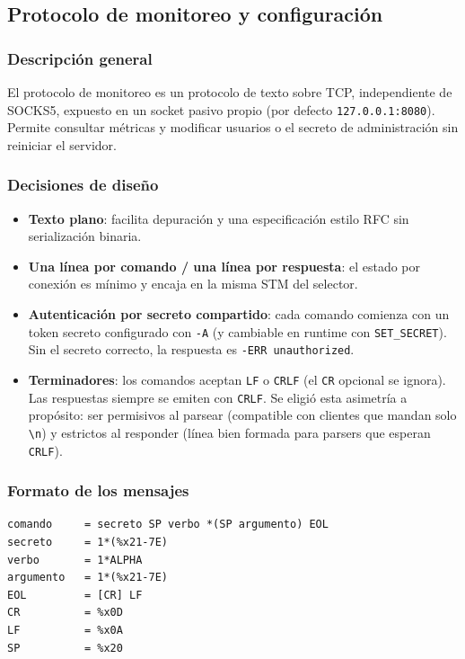 \documentclass[12pt,a4paper]{article}
\begin{document}
\subsection{Protocolo de monitoreo y configuración}

\subsubsection{Descripción general}

El protocolo de monitoreo es un protocolo de texto sobre TCP, independiente de SOCKS5,
expuesto en un socket pasivo propio (por defecto \texttt{127.0.0.1:8080}). Permite
consultar métricas y modificar usuarios o el secreto de administración sin reiniciar
el servidor.

\subsubsection{Decisiones de diseño}

\begin{itemize}
    \item \textbf{Texto plano}: facilita depuración y una especificación estilo RFC
          sin serialización binaria.
    \item \textbf{Una línea por comando / una línea por respuesta}: el estado por
          conexión es mínimo y encaja en la misma STM del selector.
    \item \textbf{Autenticación por secreto compartido}: cada comando comienza con
          un token secreto configurado con \texttt{-A} (y cambiable en runtime con
          \texttt{SET\_SECRET}). Sin el secreto correcto, la respuesta es
          \texttt{-ERR unauthorized}.
    \item \textbf{Terminadores}: los comandos aceptan \texttt{LF} o \texttt{CRLF}
          (el \texttt{CR} opcional se ignora). Las respuestas siempre se emiten con
          \texttt{CRLF}. Se eligió esta asimetría a propósito: ser permisivos al
          parsear (compatible con clientes que mandan solo \texttt{\textbackslash n})
          y estrictos al responder (línea bien formada para parsers que esperan
          \texttt{CRLF}).
\end{itemize}

\subsubsection{Formato de los mensajes}

\begin{lstlisting}[caption=Gramática ABNF de comandos]
comando     = secreto SP verbo *(SP argumento) EOL
secreto     = 1*(%x21-7E)
verbo       = 1*ALPHA
argumento   = 1*(%x21-7E)
EOL         = [CR] LF
CR          = %x0D
LF          = %x0A
SP          = %x20
\end{lstlisting}
\end{document}
